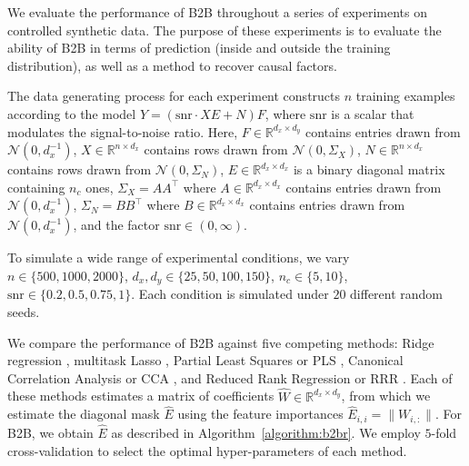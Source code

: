 We evaluate the performance of B2B throughout a series of experiments on controlled synthetic data.
%
The purpose of these experiments is to evaluate the ability of B2B in terms of prediction (inside and outside the training distribution), as well as a method to recover causal factors.

The data generating process for each experiment constructs $n$ training examples according to the model $Y = (\text{snr} \cdot XE + N)F$, where $\text{snr}$ is a scalar that modulates the signal-to-noise ratio.
%
Here,
    $F \in \mathbb{R}^{d_x \times d_y}$ contains entries drawn from $\mathcal{N}(0, d_x^{-1})$,
    $X \in \mathbb{R}^{n \times d_x}$ contains rows drawn from $\mathcal{N}(0, \Sigma_X)$,
    $N \in \mathbb{R}^{n \times d_x}$ contains rows drawn from $\mathcal{N}(0, \Sigma_N)$,
    $E \in \mathbb{R}^{d_x \times d_x}$ is a binary diagonal matrix containing $n_c$ ones,
    $\Sigma_X = AA^\top$ where $A \in \mathbb{R}^{d_x \times d_x}$ contains entries drawn from $\mathcal{N}(0, d_x^{-1})$,
    $\Sigma_N = BB^\top$ where $B \in \mathbb{R}^{d_x \times d_x}$ contains entries drawn from $\mathcal{N}(0, d_x^{-1})$,
and the factor $\text{snr} \in (0, \infty)$.

To simulate a wide range of experimental conditions, we vary $n \in \{500, 1000, 2000\}$, $d_x, d_y \in \{ 25, 50, 100, 150 \}$, $n_c \in \{ 5, 10 \}$, $\text{snr} \in \{ 0.2, 0.5, 0.75, 1 \}$.
%
Each condition is simulated under $20$ different random seeds.

We compare the performance of B2B against five competing methods:
%
Ridge regression \citep{hoerl1959optimum}, multitask Lasso \citep{argyriou2008convex}, Partial Least Squares or PLS \citep{wold_pls, tenenhaus_pls}, Canonical Correlation Analysis or CCA \citep{cca_hotelling}, and Reduced Rank Regression or RRR \citep{Izenman_rrr}.
%
Each of these methods estimates a matrix of coefficients $\hat{W} \in \mathbb{R}^{d_x \times d_y}$, from which we estimate the diagonal mask $\hat{E}$ using the feature importances $\hat{E}_{i,i} = \| W_{i, :} \|$.
%
For B2B, we obtain $\hat{E}$ as described in Algorithm~\ref{algorithm:b2br}.
%
We employ $5$-fold cross-validation to select the optimal hyper-parameters of each method.


